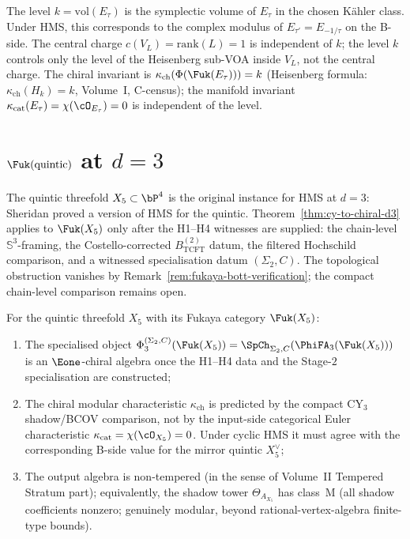 \begin{remark}
\label{rem:fukaya-elliptic-volume}
The level $k = \mathrm{vol}(E_\tau)$ is the symplectic volume of
$E_\tau$ in the chosen K\"ahler class. Under HMS, this
corresponds to the complex modulus of $E_{\tau'} = E_{-1/\tau}$
on the B-side. The central charge $c(V_L) = \mathrm{rank}(L) = 1$
is independent of $k$; the level $k$ controls only the level of
the Heisenberg sub-VOA inside $V_L$, not the central charge. The
chiral invariant is $\kappa_{\mathrm{ch}}(\Phi(\Fuk(E_\tau)))
= k$ (Heisenberg formula: $\kappa_{\mathrm{ch}}(H_k) = k$, Volume~I,
C-census); the manifold invariant $\kappa_{\mathrm{cat}}(E_\tau) =
\chi(\cO_{E_\tau}) = 0$ is independent of the level.
\end{remark}


\section{\texorpdfstring{$\Fuk(\text{quintic})$}{Fuk(quintic)} at \texorpdfstring{$d = 3$}{d = 3}}
\label{sec:fukaya-quintic-conditional}

The quintic threefold $X_5 \subset \bP^4$ is the original instance
for HMS at $d = 3$: Sheridan proved a version of HMS for the
quintic. Theorem~\ref{thm:cy-to-chiral-d3} applies to
$\Fuk(X_5)$ only after the H1--H4 witnesses are supplied: the
chain-level $\mathbb{S}^3$-framing, the Costello-corrected
$B^{(2)}_{\mathrm{TCFT}}$ datum, the filtered Hochschild comparison,
and a witnessed specialisation datum $(\Sigma_2,C)$. The topological
obstruction vanishes by Remark~\ref{rem:fukaya-bott-verification};
the compact chain-level comparison remains open.

\begin{conjecture}[\texorpdfstring{$\Phi(\Fuk(X_5))$}{Phi(Fuk(X-5))} at \texorpdfstring{$d = 3$}{d = 3}]
\label{conj:fukaya-quintic-d3}
\ClaimStatusConjectured
For the quintic threefold $X_5$ with its Fukaya category
$\Fuk(X_5)$:
\begin{enumerate}[label=(\roman*)]
 \item The specialised object
 $\Phi_3^{(\Sigma_2,C)}(\Fuk(X_5))
 = \SpCh_{\Sigma_2, C}(\PhiFA_3(\Fuk(X_5)))$ is an
 $\Eone$-chiral algebra once the H1--H4 data and the Stage-$2$
 specialisation are constructed;
 \item The chiral modular characteristic $\kappa_{\mathrm{ch}}$
 is predicted by the compact CY$_3$ shadow/BCOV comparison, not by
 the input-side categorical Euler characteristic
 $\kappa_{\mathrm{cat}}=\chi(\cO_{X_5})=0$. Under cyclic HMS it
 must agree with the corresponding B-side value for the mirror
 quintic $X_5^\vee$;
 \item The output algebra is non-tempered (in the sense of
 Volume~II Tempered Stratum part); equivalently, the
 shadow tower $\Theta_{A_{X_5}}$ has class~M
 \textup{(}all shadow coefficients nonzero; genuinely modular,
 beyond rational-vertex-algebra finite-type bounds\textup{)}.
\end{enumerate}
\end{conjecture}

